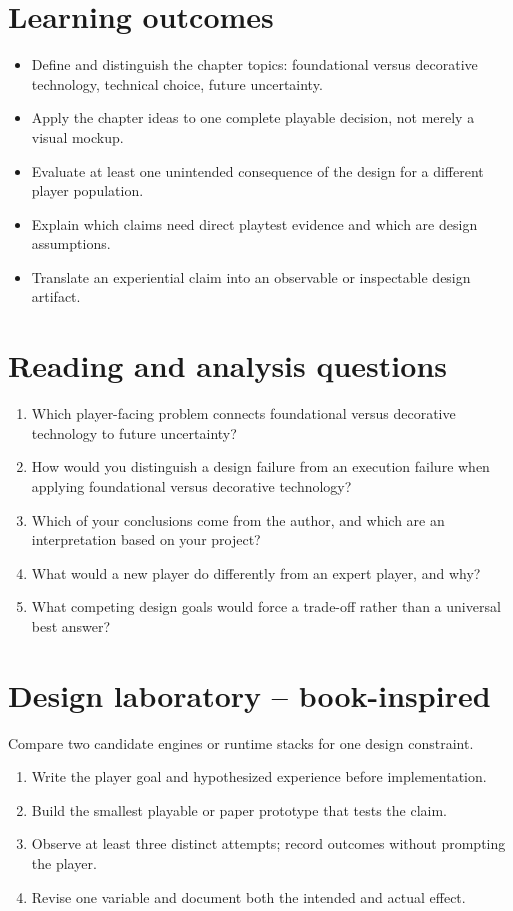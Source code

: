 \documentclass[11pt]{article}
\begin{document}
\section{Learning outcomes}
\begin{itemize}
\item Define and distinguish the chapter topics: foundational versus decorative technology, technical choice, future uncertainty.
\item Apply the chapter ideas to one complete playable decision, not merely a visual mockup.
\item Evaluate at least one unintended consequence of the design for a different player population.
\item Explain which claims need direct playtest evidence and which are design assumptions.
\item Translate an experiential claim into an observable or inspectable design artifact.
\end{itemize}

\section{Reading and analysis questions}
\begin{enumerate}
\item Which player-facing problem connects foundational versus decorative technology to future uncertainty?
\item How would you distinguish a design failure from an execution failure when applying foundational versus decorative technology?
\item Which of your conclusions come from the author, and which are an interpretation based on your project?
\item What would a new player do differently from an expert player, and why?
\item What competing design goals would force a trade-off rather than a universal best answer?
\end{enumerate}

\section{Design laboratory -- book-inspired}
Compare two candidate engines or runtime stacks for one design constraint.

\begin{enumerate}
\item Write the player goal and hypothesized experience before implementation.
\item Build the smallest playable or paper prototype that tests the claim.
\item Observe at least three distinct attempts; record outcomes without prompting the player.
\item Revise one variable and document both the intended and actual effect.
\end{enumerate}
\end{document}

